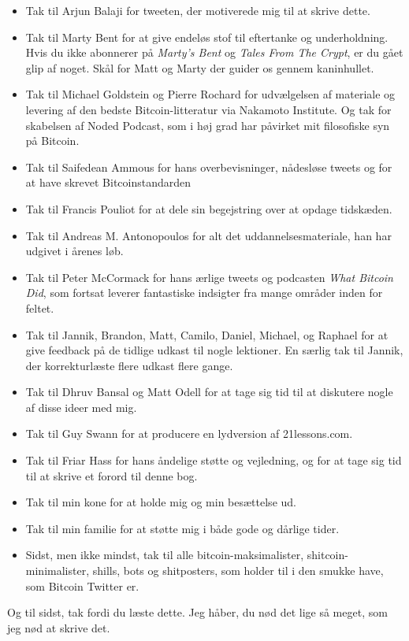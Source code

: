 \documentclass[paper=6in:9in,pagesize=pdftex,headinclude=on,footinclude=on,12pt]{scrbook}
\begin{document}
\begin{itemize}
  \item Tak til Arjun Balaji for tweeten, der motiverede mig til at skrive dette. \item Tak til Marty Bent for at give endeløs stof til eftertanke og underholdning. Hvis du ikke abonnerer på \textit{Marty's Bent} og \textit{Tales From The Crypt}, er du gået glip af noget. Skål for Matt og Marty der guider os gennem kaninhullet. \item Tak til Michael Goldstein og Pierre Rochard for udvælgelsen af materiale og levering af den bedste Bitcoin-litteratur via Nakamoto Institute. Og tak for skabelsen af Noded Podcast, som i høj grad har påvirket mit filosofiske syn på Bitcoin. \item Tak til Saifedean Ammous for hans overbevisninger, nådesløse tweets og for at have skrevet Bitcoinstandarden \item Tak til Francis Pouliot for at dele sin begejstring over at opdage tidskæden. \item Tak til Andreas M. Antonopoulos for alt det uddannelsesmateriale, han har udgivet i årenes løb. \item Tak til Peter McCormack for hans ærlige tweets og podcasten \textit{What Bitcoin Did}, som fortsat leverer fantastiske indsigter fra mange områder inden for feltet. \item Tak til Jannik, Brandon, Matt, Camilo, Daniel, Michael, og Raphael for at give feedback på de tidlige udkast til nogle lektioner. En særlig tak til Jannik, der korrekturlæste flere udkast flere gange. \item Tak til Dhruv Bansal og Matt Odell for at tage sig tid til at diskutere nogle af disse ideer med mig. \item Tak til Guy Swann for at producere en lydversion af 21lessons.com. \item Tak til Friar Hass for hans åndelige støtte og vejledning, og for at tage sig tid til at skrive et forord til denne bog. \item Tak til min kone for at holde mig og min besættelse ud. \item Tak til min familie for at støtte mig i både gode og dårlige tider. \item Sidst, men ikke mindst, tak til alle bitcoin-maksimalister, shitcoin-minimalister, shills, bots og shitposters, som holder til i den smukke have, som Bitcoin Twitter er. \end{itemize}

Og til sidst, tak fordi du læste dette. Jeg håber, du nød det lige så meget, som jeg nød at skrive det. 
\end{document}
